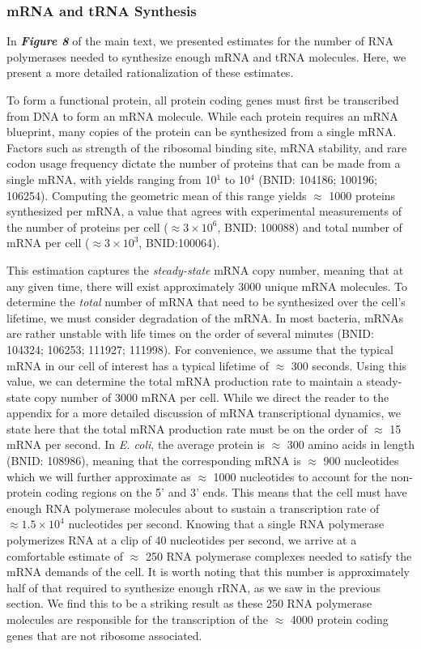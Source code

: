 \subsubsection{mRNA and tRNA Synthesis}
In \textbf{\textit{Figure 8}} of the main text, we presented
estimates for the number of RNA polymerases needed to synthesize enough mRNA
and tRNA molecules. Here, we present a more detailed rationalization of these estimates.

To form a functional protein, all protein coding genes must first be
transcribed from DNA to form an mRNA molecule. While each protein requires an
mRNA blueprint, many copies of the protein can be synthesized from a single
mRNA. Factors such as strength of the ribosomal binding site, mRNA stability,
and rare codon usage frequency dictate the number of proteins that can be
made from a single mRNA, with yields ranging from 10$^1$ to 10$^4$ (BNID:
104186; 100196; 106254). Computing the geometric mean of this range yields
$\approx$ 1000 proteins synthesized per mRNA, a value that agrees with
experimental measurements of the number of proteins per cell ($\approx 3
\times 10^6$, BNID: 100088) and total number of mRNA per cell ($\approx 3
\times 10^3$, BNID:100064).

This estimation captures the \textit{steady-state} mRNA copy number, meaning
that at any given time, there will exist approximately 3000 unique mRNA
molecules. To determine the \textit{total} number of mRNA that need to be
synthesized over the cell's lifetime, we must consider degradation of the
mRNA. In most bacteria, mRNAs are rather unstable with life times on the
order of several minutes (BNID: 104324; 106253; 111927; 111998). For
convenience, we assume that the typical mRNA in our cell of interest has a
typical lifetime of $\approx$ 300 seconds. Using this value, we can determine
the total mRNA production rate to maintain a steady-state copy number of 3000
mRNA per cell. While we direct the reader to the appendix for a more detailed
discussion of mRNA transcriptional dynamics, we state here that the total
mRNA production rate must be on the order of $\approx$ 15 mRNA per second. In
\textit{E. coli}, the average protein is $\approx$ 300 amino acids in length
(BNID: 108986), meaning that the corresponding mRNA is $\approx$ 900
nucleotides which we will further approximate as $\approx$ 1000 nucleotides
to account for the non-protein coding regions on the 5' and 3' ends. This
means that the cell must have enough RNA polymerase molecules about to
sustain a transcription rate of $\approx 1.5 \times 10^4$ nucleotides per
second. Knowing that a single RNA polymerase polymerizes RNA at a clip of 40
nucleotides per second, we arrive at a comfortable estimate of $\approx$ 250
RNA polymerase complexes needed to satisfy the mRNA demands of the cell. It
is worth noting that this number is approximately half of that required to
synthesize enough rRNA, as we saw in the previous section. We find this to be
a striking result as these 250 RNA polymerase molecules are responsible for
the transcription of the $\approx$ 4000 protein coding genes that are not
ribosome associated.

